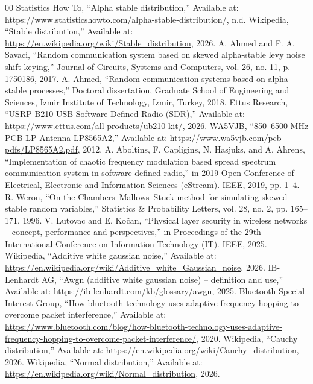 \documentclass[conference]{IEEEtran}
\begin{document}
\begin{thebibliography}{00}
 {Statistics How To}, ``Alpha stable distribution,'' Available at: \url{https://www.statisticshowto.com/alpha-stable-distribution/}, n.d.
 {Wikipedia}, ``Stable distribution,'' Available at: \url{https://en.wikipedia.org/wiki/Stable_distribution}, 2026.
 A. Ahmed and F. A. Savaci, ``Random communication system based on skewed alpha-stable levy noise shift keying,'' Journal of Circuits, Systems and Computers, vol. 26, no. 11, p. 1750186, 2017.
 A. Ahmed, ``Random communication systems based on alpha-stable processes,'' Doctoral dissertation, Graduate School of Engineering and Sciences, Izmir Institute of Technology, Izmir, Turkey, 2018.
 {Ettus Research}, ``{USRP B210 USB Software Defined Radio (SDR)},'' Available at: \url{https://www.ettus.com/all-products/ub210-kit/}, 2026.
 {WA5VJB}, ``{850--6500 MHz PCB LP Antenna LP8565A2},'' Available at: \url{https://www.wa5vjb.com/pcb-pdfs/LP8565A2.pdf}, 2012.
 A. Aboltins, F. Capligins, N. Hasjuks, and A. Ahrens, ``Implementation of chaotic frequency modulation based spread spectrum communication system in software-defined radio,'' in 2019 Open Conference of Electrical, Electronic and Information Sciences (eStream). IEEE, 2019, pp. 1--4.
 R. Weron, ``On the {Chambers--Mallows--Stuck} method for simulating skewed stable random variables,'' Statistics \& Probability Letters, vol. 28, no. 2, pp. 165--171, 1996.
 V. Lutovac and E. Kočan, ``Physical layer security in wireless networks -- concept, performance and perspectives,'' in Proceedings of the 29th International Conference on Information Technology (IT). IEEE, 2025.
 {Wikipedia}, ``Additive white gaussian noise,'' Available at: \url{https://en.wikipedia.org/wiki/Additive_white_Gaussian_noise}, 2026.
 {IB-Lenhardt AG}, ``Awgn (additive white gaussian noise) -- definition and use,'' Available at: \url{https://ib-lenhardt.com/kb/glossary/awgn}, 2025.
 {Bluetooth Special Interest Group}, ``How bluetooth technology uses adaptive frequency hopping to overcome packet interference,'' Available at: \url{https://www.bluetooth.com/blog/how-bluetooth-technology-uses-adaptive-frequency-hopping-to-overcome-packet-interference/}, 2020.
 {Wikipedia}, ``Cauchy distribution,'' Available at: \url{https://en.wikipedia.org/wiki/Cauchy_distribution}, 2026.
 {Wikipedia}, ``Normal distribution,'' Available at: \url{https://en.wikipedia.org/wiki/Normal_distribution}, 2026.

\end{thebibliography}
\end{document}
